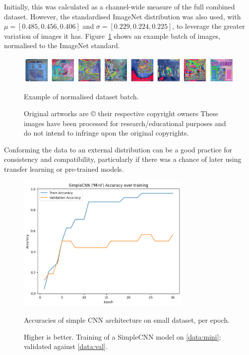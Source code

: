                 Initially, this was calculated as a channel-wide measure of the full combined dataset. However, the standardised ImageNet distribution was also used, with \( \mu = [0.485, 0.456, 0.406] \) and \( \sigma = [0.229, 0.224, 0.225] \), to leverage the greater variation of images it has. Figure~\ref{fig:normalisedArts} shows an example batch of images, normalised to the ImageNet standard.
        
                \begin{figure}[h]
                    \centering
                    \includegraphics[width=\textwidth]{images/NormalisedArts.png}
                    \caption{Example of normalised dataset batch.}
                    \label{fig:normalisedArts}
                    \caption*{
                        Original artworks are © their respective copyright owners
                        \footnotesize These images have been processed for research/educational purposes and do not intend to infringe upon the original copyrights.
                    }
                \end{figure}
    
                Conforming the data to an external distribution can be a good practice for consistency and compatibility, particularly if there was a chance of later using transfer learning or pre-trained models.
    
                \begin{figure}[h]
                    \centering
                    \includegraphics[width=0.75\textwidth]{images/SimpleCNN-Mini_Train.png}
                    \caption{Accuracies of simple CNN architecture on small dataset, per epoch.}
                    \label{fig:SimpleCNN-Mini_Train}
                    \caption*{Higher is better. Training of a SimpleCNN model on \ref{data:mini}; validated against \ref{data:val}.}
                \end{figure}
        

